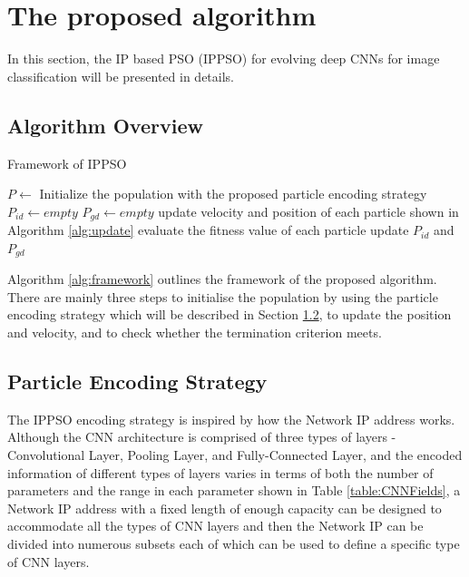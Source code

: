 \documentclass[conference]{IEEEtran}
\begin{document}
\section{The proposed algorithm}\label{sec:ProposedAlgorithm}
In this section, the IP based PSO (IPPSO) for evolving deep CNNs for image classification will be presented in details. 


\subsection{Algorithm Overview}
\begin{algorithm}
	\caption{Framework of IPPSO}
	\label{alg:framework}
	\begin{algorithmic}
		\renewcommand{\algorithmicrequire}{\textbf{Input:}}
		\renewcommand{\algorithmicensure}{\textbf{Output:}}
		\STATE $P \leftarrow$ Initialize the population with the proposed particle encoding strategy
		\STATE $P_{id} \leftarrow empty$
		\STATE $P_{gd} \leftarrow empty$
			\STATE update velocity and position of each particle shown in Algorithm \ref{alg:update}
			\STATE evaluate the fitness value of each particle
			\STATE update $P_{id}$ and $P_{gd}$
		\ENDWHILE		
	\end{algorithmic}
\end{algorithm}

Algorithm \ref{alg:framework} outlines the framework of the proposed algorithm. There are mainly three steps to initialise the population by using the particle encoding strategy which will be described in Section \ref{sec:ParticleEncodingStrategy}, to update the position and velocity, and to check whether the termination criterion meets.

\subsection{Particle Encoding Strategy}\label{sec:ParticleEncodingStrategy}

The IPPSO encoding strategy is inspired by how the Network IP address works. Although the CNN architecture is comprised of three types of layers - Convolutional Layer, Pooling Layer, and Fully-Connected Layer, and the encoded information of different types of layers varies in terms of both the number of parameters and the range in each parameter shown in Table \ref{table:CNNFields}, a Network IP address with a fixed length of enough capacity can be designed to accommodate all the types of CNN layers and then the Network IP can be divided into numerous subsets each of which can be used to define a specific type of CNN layers. 
\end{document}

